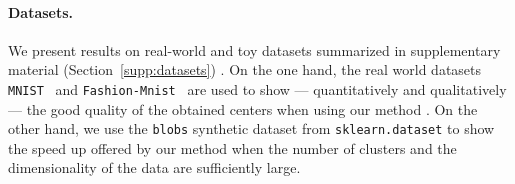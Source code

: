 \paragraph{Datasets.}
We present results on real-world and toy datasets summarized in supplementary material (Section~\ref{supp:datasets}) . On the one hand, the real world datasets \texttt{MNIST}~\cite{lecun-mnisthandwrittendigit-2010} and \texttt{Fashion-Mnist}~\cite{Pedregosa2011Scikit} %
are used to show --- quantitatively and qualitatively --- the good quality of the obtained centers when using our method \qkmeans. On the other hand, we use the \texttt{blobs} synthetic dataset from \texttt{sklearn.dataset} to show the speed up offered by our method \qkmeans when the number of clusters and the dimensionality of the data are sufficiently large.


